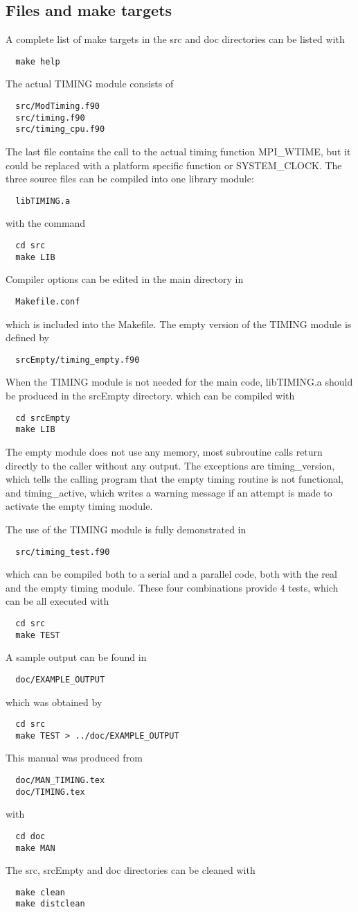 \newpage
\subsection{Files and make targets}

A complete list of make targets in the src and doc directories
can be listed with
\begin{verbatim}
  make help
\end{verbatim}
The actual TIMING module consists of
\begin{verbatim}
  src/ModTiming.f90
  src/timing.f90
  src/timing_cpu.f90
\end{verbatim}
The last file contains the call to the actual timing function MPI\_WTIME, 
but it could be replaced with a platform specific function or SYSTEM\_CLOCK.
The three source files can be compiled into one library module:
\begin{verbatim}
  libTIMING.a
\end{verbatim}
with the command
\begin{verbatim}
  cd src
  make LIB
\end{verbatim}
Compiler options can be edited in the main directory in
\begin{verbatim}
  Makefile.conf
\end{verbatim}
which is included into the Makefile.
The empty version of the TIMING module is defined by
\begin{verbatim}
  srcEmpty/timing_empty.f90
\end{verbatim}
When the TIMING module is not needed for the main code, 
libTIMING.a should be produced in the srcEmpty directory.
which can be compiled with
\begin{verbatim}
  cd srcEmpty
  make LIB
\end{verbatim}
The empty module does not use any memory, most subroutine calls 
return directly to the caller without any output. The exceptions
are timing\_version, which tells the calling program that the
empty timing routine is not functional, and timing\_active, which
writes a warning message if an attempt is made to activate 
the empty timing module.

The use of the TIMING module is fully demonstrated in 
\begin{verbatim}
  src/timing_test.f90
\end{verbatim}
which can be compiled both to a serial and a parallel code, both with
the real and the empty timing module. These four combinations
provide 4 tests, which can be all executed with
\begin{verbatim}
  cd src
  make TEST
\end{verbatim}
A sample output can be found in
\begin{verbatim}
  doc/EXAMPLE_OUTPUT
\end{verbatim}
which was obtained by
\begin{verbatim}
  cd src
  make TEST > ../doc/EXAMPLE_OUTPUT
\end{verbatim}

This manual was produced from
\begin{verbatim}
  doc/MAN_TIMING.tex
  doc/TIMING.tex
\end{verbatim}
with
\begin{verbatim}
  cd doc
  make MAN
\end{verbatim}
The src, srcEmpty and doc directories can be cleaned with
\begin{verbatim}
  make clean
  make distclean
\end{verbatim}
